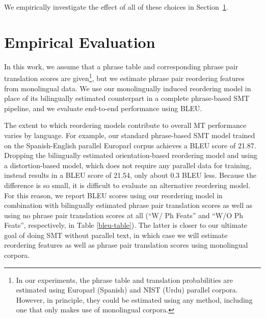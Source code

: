 \documentclass[11pt,letterpaper]{article}
\newcommand{\todo}[1]{\textcolor{red}{TODO: #1}}
\newcommand{\secref}[1]{Section~\ref{#1}}
\begin{document}
We empirically investigate the effect of all of these choices in \secref{sect:eval}.

\section{Empirical Evaluation} \label{sect:eval}

In this work, we assume that a phrase table and corresponding phrase pair translation scores are given\footnote{In our experiments, the phrase table and translation probabilities are estimated using Europarl (Spanish) and NIST (Urdu) parallel corpora. However, in principle, they could be estimated using any method, including one that only makes use of monolingual corpora.}, but we estimate phrase pair reordering features from monolingual data.  We use our monolingually induced reordering model in place of its bilingually estimated counterpart in a complete phrase-based SMT pipeline, and we evaluate end-to-end performance using BLEU. 

The extent to which reordering models contribute to overall MT performance varies by language. For example, our standard phrase-based SMT model trained on the Spanish-English parallel Europarl corpus achieves a BLEU score of 21.87. Dropping the bilingually estimated orientation-based reordering model and using a distortion-based model, which does not require any parallel data for training, instead results in a BLEU score of 21.54, only about 0.3 BLEU less. Because the difference is so small, it is difficult to evaluate an alternative reordering model. For this reason, we report BLEU scores using our reordering model in combination with bilingually estimated phrase pair translation scores as well as using no phrase pair translation scores at all (``W/ Ph Feats'' and ``W/O Ph Feats'', respectively, in Table \ref{bleu-table}). The latter is closer to our ultimate goal of doing SMT without parallel text, in which case we will estimate reordering features as well as phrase pair translation scores using monolingual corpora.

\end{document}
